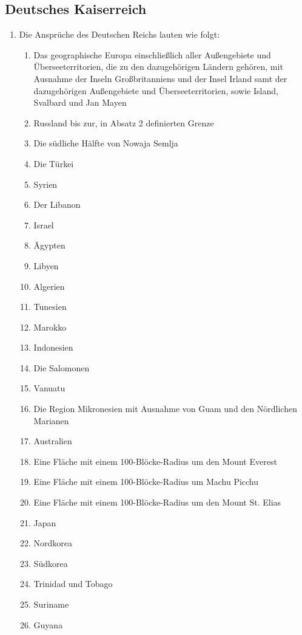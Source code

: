 \documentclass{article}
\begin{document}
\subsection{Deutsches Kaiserreich}\label{german}
\begin{enumerate}[(1)]
    \item Die Ansprüche des Deutschen Reichs lauten wie folgt:
    \begin{enumerate}[1.]
        \item Das geographische Europa einschließlich aller Außengebiete und Überseeterritorien, die zu den dazugehörigen Ländern gehören, mit Ausnahme der Inseln Großbritanniens und der Insel Irland samt der dazugehörigen Außengebiete und Überseeterritorien, sowie Island, Svalbard und Jan Mayen
        \item Russland bis zur, in Absatz 2 definierten Grenze
        \item Die südliche Hälfte von Nowaja Semlja
        \item Die Türkei
        \item Syrien
        \item Der Libanon
        \item Israel
        \item Ägypten
        \item Libyen
        \item Algerien
        \item Tunesien
        \item Marokko
        \item Indonesien
        \item Die Salomonen
        \item Vanuatu
        \item Die Region Mikronesien mit Ausnahme von Guam und den Nördlichen Marianen
        \item Australien
        \item Eine Fläche mit einem 100-Blöcke-Radius um den Mount Everest
        \item Eine Fläche mit einem 100-Blöcke-Radius um Machu Picchu
        \item Eine Fläche mit einem 100-Blöcke-Radius um den Mount St. Elias
        \item Japan
        \item Nordkorea
        \item Südkorea
        \item Trinidad und Tobago
        \item Suriname
        \item Guyana

\end{enumerate}
\end{enumerate}
\end{document}
